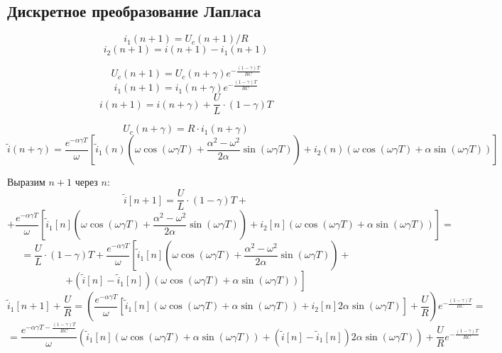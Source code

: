 \documentclass[a4paper,12pt]{article}
\begin{document}
\subsection{Дискретное преобразование Лапласа}

$$
i_1(n+1) = U_c(n+1)/R
$$
$$
i_2(n+1) = i(n+1) - i_1(n+1)
$$

$$
U_c(n+1) = U_c(n+\gamma) e^{-\frac{(1-\gamma)T}{RC}}
$$
$$
i_1(n+1) = i_1(n+\gamma) e^{-\frac{(1-\gamma)T}{RC}}
$$
$$
i(n+1) = i(n+\gamma) + \frac{U}{L}\cdot (1-\gamma)T
$$

$$
U_c(n+\gamma) = R\cdot i_1(n+\gamma)
$$
$$
\tilde{i}(n+\gamma) = \frac{e^{-\alpha\gamma T}}{\omega} 
\left[
\tilde{i}_1(n)\left(\omega\cos(\omega\gamma T) + \frac{\alpha^2 - \omega^2}{2\alpha}\sin(\omega\gamma T) \right)
+ i_2(n)\left(\omega\cos(\omega\gamma T)  + \alpha\sin(\omega\gamma T)\right)
\right]
$$


Выразим $n+1$ через $n$:
$$
\tilde{i}[n+1] = \frac{U}{L}\cdot (1-\gamma)T +
$$
$$
+ \frac{e^{-\alpha\gamma T}}{\omega}
\left[
\tilde{i}_1[n] \left(\omega\cos(\omega\gamma T) + \frac{\alpha^2 - \omega^2}{2\alpha}\sin(\omega\gamma T) \right)
+ i_2[n]\left(\omega\cos(\omega\gamma T)  + \alpha\sin(\omega\gamma T)\right)
\right] =
$$ 
$$
= \frac{U}{L}\cdot (1-\gamma)T + \frac{e^{-\alpha\gamma T}}{\omega}
\left[
\tilde{i}_1[n]\left(\omega\cos(\omega\gamma T) + \frac{\alpha^2 - \omega^2}{2\alpha}\sin(\omega\gamma T) \right) \right. +
$$
$$
\left.
+ \left(\tilde{i}[n] - \tilde{i}_1[n]\right)\left(\omega\cos(\omega\gamma T)
+ \alpha\sin(\omega\gamma T)\right)
\right]
$$
$$
\tilde{i}_1[n+1] +\frac{U}{R} = \left(\frac{e^{-\alpha\gamma T}}{\omega} 
\left[ \tilde{i}_1[n] 
\left(\omega\cos(\omega\gamma T) + \alpha \sin(\omega\gamma T)\right)
+ i_2[n] 2\alpha\sin(\omega\gamma T) \right] + \frac{U}{R}\right) e^{-\frac{(1-\gamma)T}{RC}} =
$$ 
$$
= \frac{e^{-\alpha\gamma T -\frac{(1-\gamma)T}{RC}}}{\omega} \left( \tilde{i}_1[n] 
\left(\omega\cos(\omega\gamma T) + \alpha \sin(\omega\gamma T)\right)
+ \left(\tilde{i}[n] - \tilde{i}_1[n]\right)2\alpha\sin(\omega\gamma T) \right)
+ \frac{U}{R} e^{-\frac{(1-\gamma)T}{RC}}
$$
\end{document}
